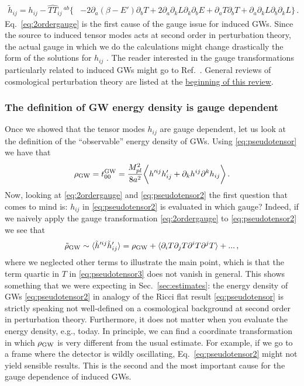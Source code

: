 \documentclass[a4paper,11pt]{article}
\numberwithin{equation}{section}
\begin{document}
\begin{align}\label{eq:2ordergauge}
\tilde h_{ij}=h_{ij}-\widehat{TT}_{ij}\,^{ab}\Big\{&-2\partial_a\left(\beta-E'\right)\partial_b T+2\partial_a\partial_kL\partial_k\partial_{b}E+\partial_aT\partial_bT+\partial_a\partial_kL\partial_b\partial_kL\Big\}\,.
\end{align}
Eq.~\eqref{eq:2ordergauge} is the first cause of the gauge issue for induced GWs. Since the source to induced tensor modes acts at second order in perturbation theory, the actual gauge in which we do the calculations might change drastically the form of the solutions for $h_{ij}$ \cite{Hwang:2017oxa}. The reader interested in the gauge transformations particularly related to induced GWs might go to Ref.~\cite{Domenech:2020xin}. General reviews of cosmological perturbation theory are listed at the \hyperref[sec:structure]{beginning of this review}.

\subsubsection{The definition of GW energy density is gauge dependent} Once we showed that the tensor modes $h_{ij}$ are gauge dependent, let us look at the definition of the ``observable'' energy density of GWs. Using \eqref{eq:pseudotensor} we have that
\begin{equation}\label{eq:pseudotensor2}
\rho_{\rm GW}=t_{00}^{\rm GW}=\frac{M_{pl}^2}{8a^2}\bigg\langle h'^{ij} h'_{ij}+\partial_k h^{ij}\partial^k h_{ij}\bigg\rangle\,.
\end{equation}
Now, looking at \eqref{eq:2ordergauge} and \eqref{eq:pseudotensor2} the first question that comes to mind is: $h_{ij}$ in \eqref{eq:pseudotensor2} is evaluated in which gauge? Indeed, if we naively apply the gauge transformation \eqref{eq:2ordergauge} to \eqref{eq:pseudotensor2} we see that
\begin{equation}\label{eq:pseudotensor3}
\tilde\rho_{\rm GW}\sim\langle \tilde h'^{ij} \tilde h'_{ij}\rangle=\rho_{\rm GW}+\langle\partial_iT\partial_jT\partial^iT\partial^jT\rangle + ...\,,
\end{equation}
where we neglected other terms to illustrate the main point, which is that the term quartic in $T$ in \eqref{eq:pseudotensor3} does not vanish in general. This shows something that we were expecting in Sec.~\ref{sec:estimates}: the energy density of GWs \eqref{eq:pseudotensor2} in analogy of the Ricci flat result \eqref{eq:pseudotensor} is strictly speaking not well-defined on a cosmological background at second order in perturbation theory. Furthermore, it does not matter when you evaluate the energy density, e.g., today. In principle, we can find a coordinate transformation in which $\rho_{\rm GW}$ is very different from the usual estimate. For example, if we go to a frame where the detector is wildly oscillating, Eq.~\eqref{eq:pseudotensor2} might not yield sensible results. This is the second and the most important cause for the gauge dependence of induced GWs.
\end{document}
